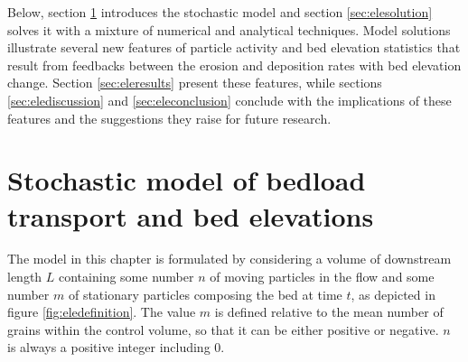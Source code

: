 Below, section \ref{sec:elemodel} introduces the stochastic model and section \ref{sec:elesolution} solves it with a mixture of numerical and analytical techniques. Model solutions illustrate several new features of particle activity and bed elevation statistics that result from feedbacks between the erosion and deposition rates with bed elevation change. Section \ref{sec:eleresults} present these features, while sections \ref{sec:elediscussion} and \ref{sec:eleconclusion} conclude with the implications of these features and the suggestions they raise for future research.

\section{Stochastic model of bedload transport and bed elevations}
\label{sec:elemodel}

The model in this chapter is formulated by considering a volume of downstream length $L$ containing some number $n$ of moving particles in the flow and some number $m$ of stationary particles composing the bed at time $t$, as depicted in figure \ref{fig:eledefinition}. The value $m$ is defined relative to the mean number of grains within the control volume, so that it can be either positive or negative. $n$ is always a positive integer including $0$.

